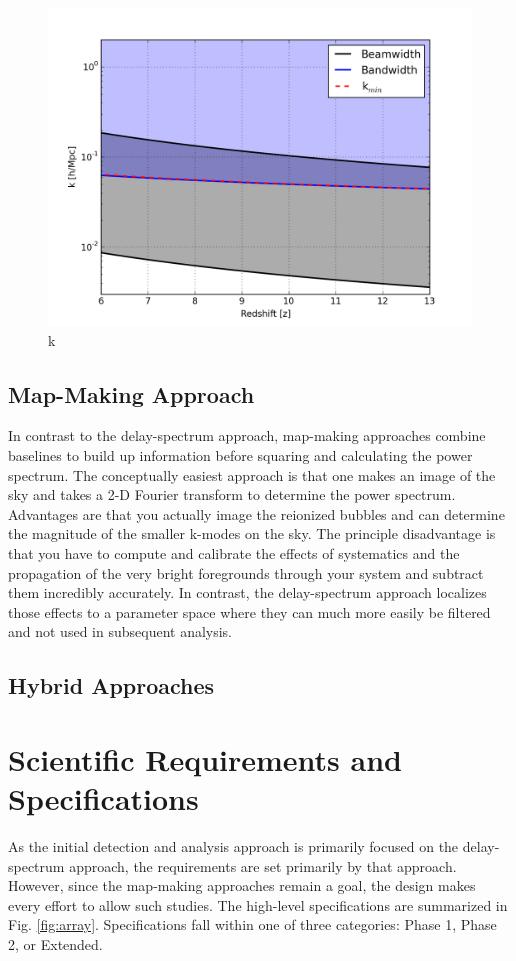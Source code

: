 \documentclass{article}
\begin{document}
\begin{figure}[t]
\centerline{
\includegraphics[width=\textwidth]{plots/kperf_heraZ.png} 
}
\caption{\small k
\label{fig:kperf}}
\end{figure}

\subsection{Map-Making Approach}
\label{sec:mapapproach}
In contrast to the delay-spectrum approach, map-making approaches combine baselines to build up information before squaring and calculating the power spectrum.  The conceptually easiest approach is that one makes an image of the sky and takes a 2-D Fourier transform to determine the power spectrum.  Advantages are that you actually image the reionized bubbles and can determine the magnitude of the smaller k-modes on the sky.  The principle disadvantage is that you have to compute and calibrate the effects of systematics and the propagation of the very bright foregrounds through your system and subtract them incredibly accurately.  In contrast, the delay-spectrum approach localizes those effects to a parameter space where they can much more easily be filtered and not used in subsequent analysis.

\subsection{Hybrid Approaches}
\label{sec:hybridapproach}

\section{Scientific Requirements and Specifications}
\label{sec:specs}
As the initial detection and analysis approach is primarily focused on the delay-spectrum approach, the requirements are set primarily by that approach.  However, since the map-making approaches remain a goal, the design makes every effort to allow such studies.  The high-level specifications are summarized in Fig. \ref{fig:array}.  Specifications fall within one of three categories:  Phase 1, Phase 2, or Extended.   
\end{document}
